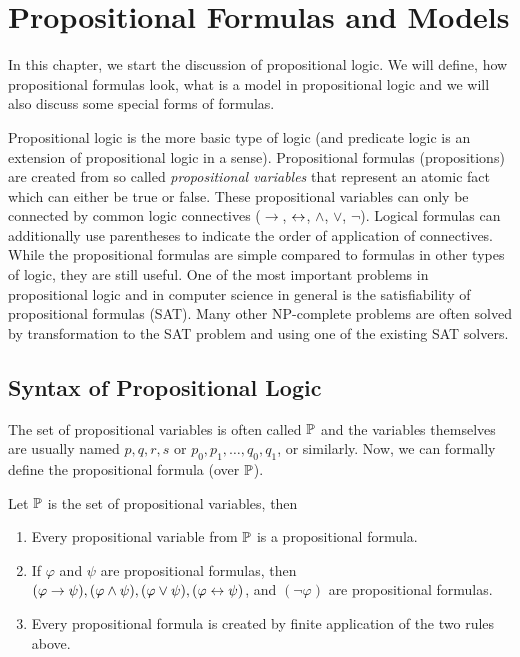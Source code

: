 
\chapter{Propositional Formulas and Models}

In this chapter, we start the discussion of propositional logic. We will define, how propositional formulas look, what is a model in propositional logic and we will also discuss some special forms of formulas.

Propositional logic is the more basic type of logic (and predicate logic is an extension of propositional logic in a sense).  Propositional formulas (propositions) are created from so called \emph{propositional variables} that represent an atomic fact which can either be true or false. These propositional variables can only be connected by common logic connectives ($\to$, $\leftrightarrow$, $\land$, $\lor$, $\neg$). Logical formulas can additionally use parentheses to indicate the order of application of connectives. While the propositional formulas are simple compared to formulas in other types of logic, they are still useful. One of the most important problems in propositional logic and in computer science in general is the satisfiability of propositional formulas (SAT). Many other NP-complete problems are often solved by transformation to the SAT problem and using one of the existing SAT solvers.

\section{Syntax of Propositional Logic}

The set of propositional variables is often called $\mathbb{P}$ and the variables themselves are usually named $p, q, r, s$ or $p_0, p_1, \dots, q_0, q_1$, or similarly. Now, we can formally define the propositional formula (over $\mathbb{P}$).

\begin{definition}
Let $\mathbb{P}$ is the set of propositional variables, then
\begin{enumerate}
  \item Every propositional variable from $\mathbb{P}$ is a propositional formula.
  \item If $\varphi$ and $\psi$ are propositional formulas, then $(\varphi \to \psi), (\varphi \land \psi), (\varphi \lor \psi), (\varphi \leftrightarrow \psi)$, and $(\neg \varphi)$ are propositional formulas.
  \item Every propositional formula is created by finite application of the two rules above.
\end{enumerate}
\end{definition}

